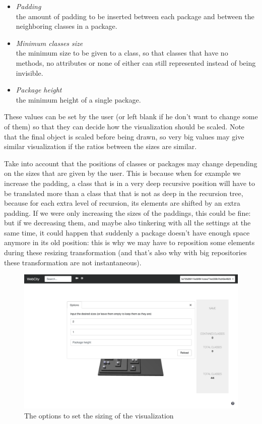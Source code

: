 \documentclass[]{usiinfbachelorproject}
\begin{document}
\begin{itemize}
\item \textit{Padding}\\ the amount of padding to be inserted between each package and between the neighboring classes in a package.
\item \textit{Minimum classes size}\\ the minimum size to be given to a class, so that classes that have no methods, no attributes or none of either can still represented instead of being invisible.
\item \textit{Package height}\\ the minimum height of a single package.
\end{itemize}

These values can be set by the user (or left blank if he don't want to change some of them) so that they can decide how the visualization should be scaled. Note that the final object is scaled before being drawn, so very big values may give similar visualization if the ratios between the sizes are similar.

Take into account that the positions of classes or packages may change depending on the sizes that are given by the user. This is because when for example we increase the padding, a class that is in a very deep recursive position will have to be translated more than a class that that is not as deep in the recursion tree, because for each extra level of recursion, its elements are shifted by an extra padding. If we were only increasing the sizes of the paddings, this could be fine: but if we decreasing them, and maybe also tinkering with all the settings at the same time, it could happen that suddenly a package doesn't have enough space anymore in its old position: this is why we may have to reposition some elements during these resizing transformation (and that's also why with big repositories these transformation are not instantaneous).

\begin{figure} [H]
\centering
\includegraphics[width=1\textwidth]{pictures/sizing_card.png}
\caption{The options to set the sizing of the visualization}
\label{fig:sizing}
\end{figure}
\end{document}
